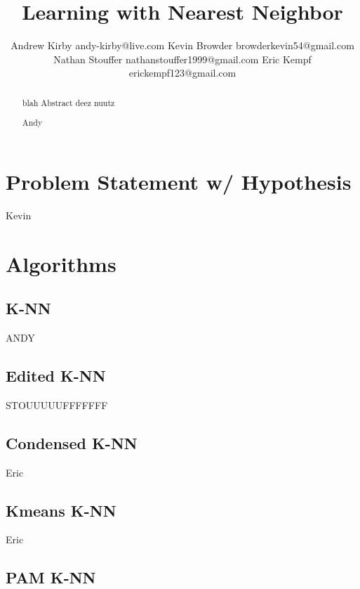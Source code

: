 \documentclass[twoside,11pt]{article}
\begin{document}
\title{Learning with Nearest Neighbor}

\author{\name Andrew Kirby \email andy-kirby@live.com \AND
		\name Kevin Browder \email browderkevin54@gmail.com \AND
		\name Nathan Stouffer \email nathanstouffer1999@gmail.com \AND
		\name Eric Kempf \email erickempf123@gmail.com }

\maketitle

\begin{abstract}
	blah Abstract deez nuutz
	
	Andy 
	
\end{abstract}

\section{Problem Statement w/ Hypothesis}

Kevin

\section{Algorithms}

\subsection{K-NN}

ANDY

\subsection{Edited K-NN}

STOUUUUUFFFFFFF

\subsection{Condensed K-NN}

Eric

\subsection{Kmeans K-NN}

Eric

\subsection{PAM K-NN}
\end{document}
